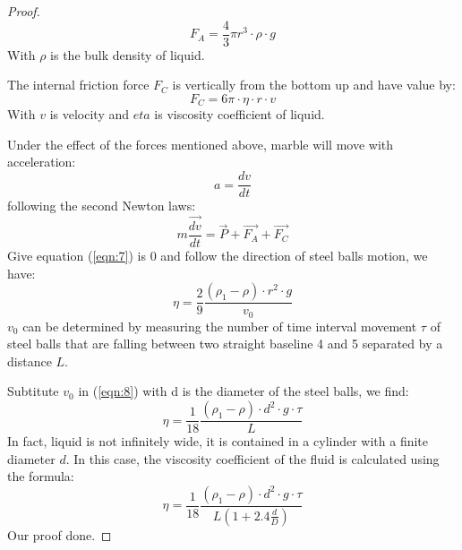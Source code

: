 \begin{proof}
\begin{equation}\label{eqn:5}
    F_A=\frac{4}{3}\pi r^3 \cdot \rho \cdot g
\end{equation}
With $\rho$ is the bulk density of liquid. \par
The internal friction force $F_C$ is vertically from the bottom up and have value by:
\begin{equation} \label{eqn:6}
    F_C=6\pi \cdot \eta \cdot r \cdot v
\end{equation}
With $v$ is velocity and $eta$ is viscosity coefficient of liquid. \par
Under the effect of the forces mentioned above, marble will move with acceleration: 
\[a=\frac{dv}{dt}\]
following the second Newton laws: 
\begin{equation}\label{eqn:7}
    m\frac{\overrightarrow{dv}}{dt}=\overrightarrow{P} + \overrightarrow{F_A} + \overrightarrow{F_C}
\end{equation}
Give equation (\ref{eqn:7}) is 0 and follow the direction of steel balls motion, we have:
\begin{equation}\label{eqn:8}
    \eta = \frac{2}{9} \frac{(\rho_1 - \rho)\cdot r^2 \cdot g}{v_0}
\end{equation}
$v_0$ can be determined by measuring the number of time interval movement
$\tau$ of steel balls that are falling between two straight baseline 4 and 5 separated by a distance $L$. \par
Subtitute $v_0$ in (\ref{eqn:8}) with d is the diameter of the steel balls, we find:
\begin{equation}\label{eqn:9}
    \eta = \frac{1}{18} \frac{(\rho_1 - \rho)\cdot d^2 \cdot g \cdot \tau}{L}
\end{equation}
In fact, liquid is not infinitely wide, it is contained in a cylinder with a finite diameter $d$. In this case, the viscosity coefficient of the fluid is calculated using the formula:
\begin{equation}
    \eta = \frac{1}{18} \frac{(\rho_1 - \rho)\cdot d^2 \cdot g \cdot \tau}{L\left(1+2.4\frac{d}{D}\right)}
\end{equation}
Our proof done.
\end{proof}


\newpage
